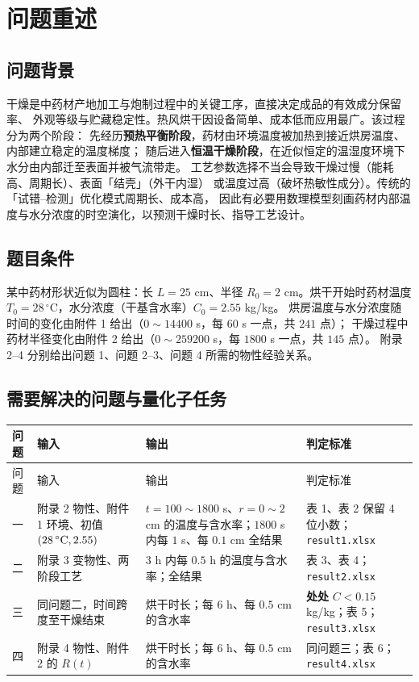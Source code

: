 \documentclass[bwprint]{cumcmthesis}
\begin{document}
\section{问题重述}

\subsection{问题背景}

干燥是中药材产地加工与炮制过程中的关键工序，直接决定成品的有效成分保留率、
外观等级与贮藏稳定性。热风烘干因设备简单、成本低而应用最广。该过程分为两个阶段：
先经历\textbf{预热平衡阶段}，药材由环境温度被加热到接近烘房温度、内部建立稳定的温度梯度；
随后进入\textbf{恒温干燥阶段}，在近似恒定的温湿度环境下水分由内部迁至表面并被气流带走。
工艺参数选择不当会导致干燥过慢（能耗高、周期长）、表面「结壳」（外干内湿）
或温度过高（破坏热敏性成分）。传统的「试错--检测」优化模式周期长、成本高，
因此有必要用数理模型刻画药材内部温度与水分浓度的时空演化，以预测干燥时长、指导工艺设计。

\subsection{题目条件}

某中药材形状近似为圆柱：长 $L=25$ cm、半径 $R_0=2$ cm。烘干开始时药材温度
$T_0=28\,^\circ$C，水分浓度（干基含水率）$C_0=2.55$ kg/kg。
烘房温度与水分浓度随时间的变化由附件 1 给出（$0\sim14400$ s，每 $60$ s 一点，共 $241$ 点）；
干燥过程中药材半径变化由附件 2 给出（$0\sim259200$ s，每 $1800$ s 一点，共 $145$ 点）。
附录 2--4 分别给出问题 1、问题 2--3、问题 4 所需的物性经验关系。

\subsection{需要解决的问题与量化子任务}

\begin{longtable}{@{}p{1.5cm}p{4.6cm}p{4.4cm}p{4.6cm}@{}}
\toprule
问题 & 输入 & 输出 & 判定标准 \\
\midrule
\endfirsthead
\toprule
问题 & 输入 & 输出 & 判定标准 \\
\midrule
\endhead
一 & 附录 2 物性、附件 1 环境、初值 $(28\,^\circ{\rm C},2.55)$ &
$t=100\sim1800$ s、$r=0\sim2$ cm 的温度与含水率；$1800$ s 内每 $1$ s、每 $0.1$ cm 全结果 &
表 1、表 2 保留 4 位小数；\texttt{result1.xlsx} \\
二 & 附录 3 变物性、两阶段工艺 & $3$ h 内每 $0.5$ h 的温度与含水率；全结果 &
表 3、表 4；\texttt{result2.xlsx} \\
三 & 同问题二，时间跨度至干燥结束 & 烘干时长；每 $6$ h、每 $0.5$ cm 的含水率 &
\textbf{处处} $C<0.15$ kg/kg；表 5；\texttt{result3.xlsx} \\
四 & 附录 4 物性、附件 2 的 $R(t)$ & 烘干时长；每 $6$ h、每 $0.5$ cm 的含水率 &
同问题三；表 6；\texttt{result4.xlsx} \\
\bottomrule
\end{longtable}
\end{document}
